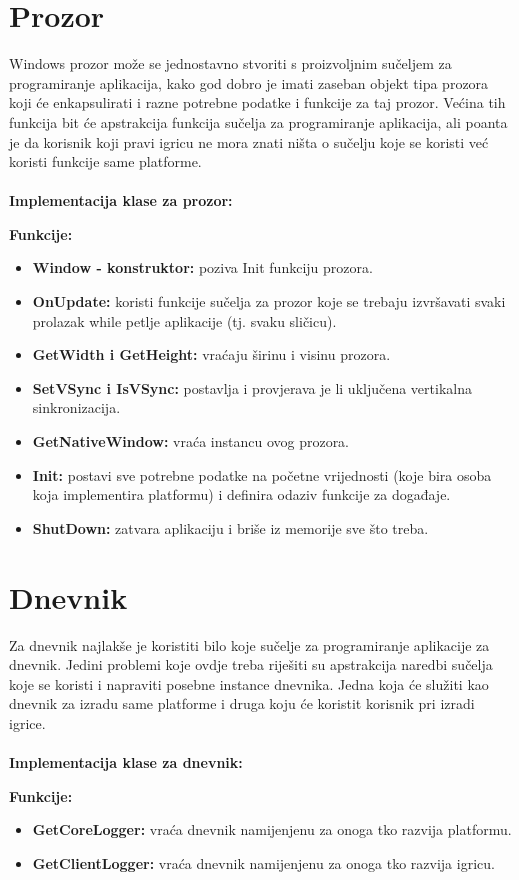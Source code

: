 \documentclass{mathos}
\begin{document}
\section{Prozor}
Windows prozor može se jednostavno stvoriti s proizvoljnim sučeljem za programiranje aplikacija, kako god dobro je imati zaseban objekt tipa prozora koji će enkapsulirati i
razne potrebne podatke i funkcije za taj prozor. Većina tih funkcija bit će apstrakcija funkcija sučelja za programiranje aplikacija, ali poanta je da korisnik koji pravi
igricu ne mora znati ništa o sučelju koje se koristi već koristi funkcije same platforme.
\\ \\
\textbf{Implementacija klase za prozor:}

\textbf{Funkcije: }
\begin{itemize}
    \item \textbf{Window - konstruktor:} poziva Init funkciju prozora.
    \item \textbf{OnUpdate:} koristi funkcije sučelja za prozor koje se trebaju izvršavati svaki prolazak while petlje aplikacije (tj. svaku sličicu).
    \item \textbf{GetWidth i GetHeight:} vraćaju širinu i visinu prozora.
    \item \textbf{SetVSync i IsVSync:} postavlja i provjerava je li uključena vertikalna sinkronizacija.
    \item \textbf{GetNativeWindow:} vraća instancu ovog prozora.
    \item \textbf{Init:} postavi sve potrebne podatke na početne vrijednosti (koje bira osoba koja implementira platformu) i definira odaziv funkcije za događaje.
    \item \textbf{ShutDown:} zatvara aplikaciju i briše iz memorije sve što treba.
\end{itemize}

\section{Dnevnik}
Za dnevnik najlakše je koristiti bilo koje sučelje za programiranje aplikacije za dnevnik. Jedini problemi koje ovdje treba riješiti su apstrakcija naredbi sučelja koje se koristi
i napraviti posebne instance dnevnika. Jedna koja će služiti kao dnevnik za izradu same platforme i druga koju će koristit korisnik pri izradi igrice.
\\ \\
\textbf{Implementacija klase za dnevnik:}

\textbf{Funkcije: }
\begin{itemize}
    \item \textbf{GetCoreLogger: } vraća dnevnik namijenjenu za onoga tko razvija platformu.
    \item \textbf{GetClientLogger: } vraća dnevnik namijenjenu za onoga tko razvija igricu.
\end{itemize}
\end{document}
